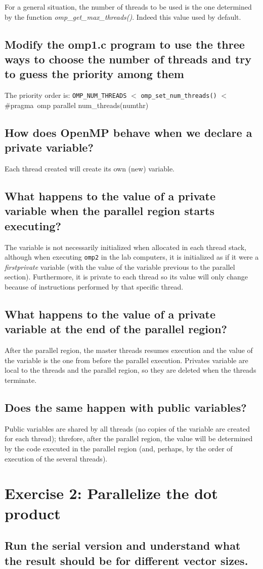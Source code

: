 \documentclass{article}
\newcommand{\question}[1]{\subsection{#1}}
\begin{document}
For a general situation, the number of threads to be used is the one determined by the function \emph{omp\_get\_max\_threads()}. Indeed this value used by default.

\question{Modify the omp1.c program to use the three ways to choose the number of threads and try to guess the priority among them}

The priority order is: \texttt{OMP\_NUM\_THREADS} $<$ \texttt{omp\_set\_num\_threads()} $<$ \#pragma\ omp parallel num\_threads(numthr) 

\question{How does OpenMP behave when we declare a private variable?}

Each thread created will create its own (new) variable.

\question{What happens to the value of a private variable when the parallel region starts executing?}

The variable is not necessarily initialized when allocated in each thread stack, although when executing \texttt{omp2} in the lab computers, it is initialized as if it were a \emph{firstprivate} variable (with the value of the variable previous to the parallel section). Furthermore, it is private to each thread so its value will only change because of instructions performed by that specific thread.

\question{What happens to the value of a private variable at the end of the parallel region?}

After the parallel region, the master threads resumes execution and the value of the variable is the one from before the parallel execution. Privates variable are local to the threads and the parallel region, so they are deleted when the threads terminate.

\question{Does the same happen with public variables?}

Public variables are shared by all threads (no copies of the variable are created for each thread); threfore, after the parallel region, the value will be determined by the code executed in the parallel region (and, perhaps, by the order of execution of the several threads).



\section{Exercise 2: Parallelize the dot product}

\question{Run the serial version and understand what the result should be for different vector sizes.} 
    
\end{document}
